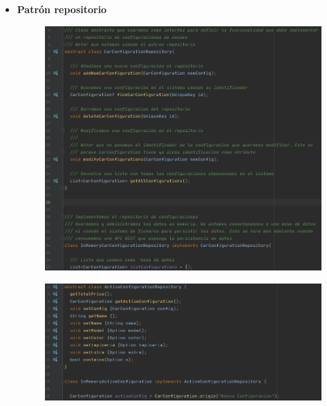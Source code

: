 \begin{itemize}
        \item \textbf{Patrón repositorio}
        \begin{figure}[H]
        \centering
        \includegraphics[scale=0.55]{imagenes/ds-repository1.png}
        \end{figure}
        \begin{figure}[H]
        \centering
        \includegraphics[scale=0.55]{imagenes/ds-repository2.png}
        \end{figure}
        
\end{itemize}






